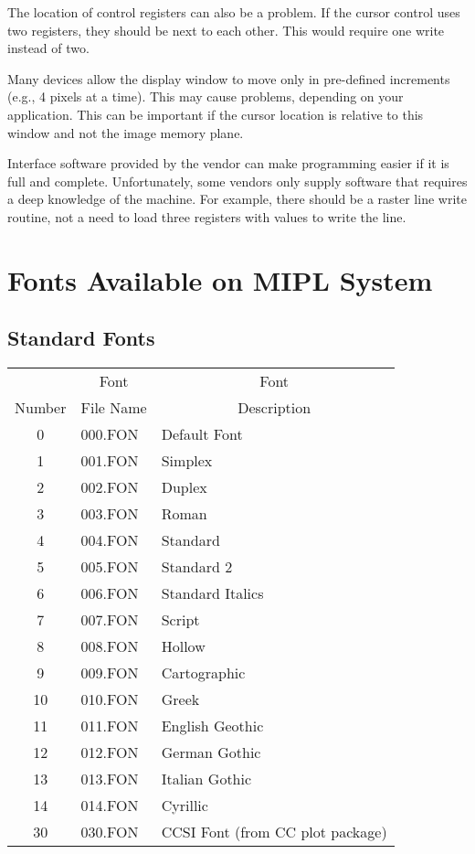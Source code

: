 The location of control registers can also be a problem.  If
the cursor control uses two registers, they should be next to each
other.  This would require one write instead of two.  

Many devices allow the display window to move only in pre-defined
increments (e.g., 4 pixels at a time).  This may cause problems,
depending on your application.  This can be important if the cursor
location is relative to this window and not the image memory plane.

Interface software provided by the vendor can make
programming easier if it is full and complete.  Unfortunately, some
vendors only supply software that requires a deep knowledge of the
machine.  For example, there should be a raster line write routine,
not a need to load three registers with values to write the line.
\cleardoublepage
\section{Fonts Available on MIPL System}
\subsection{Standard Fonts}
\begin{tabular}{|c|l|l|}
\hline
&\multicolumn{1}{|c|}{Font}
&\multicolumn{1}{|c|}{Font}\\
\multicolumn{1}{|c|}{Number}
&\multicolumn{1}{|c|}{File Name}
&\multicolumn{1}{|c|}{Description}\\
\hline
0 & 000.FON & Default Font\\
1 & 001.FON & Simplex\\
2 & 002.FON & Duplex\\
3 & 003.FON & Roman\\
4 & 004.FON & Standard\\
5 & 005.FON & Standard 2\\
6 & 006.FON & Standard Italics\\
7 & 007.FON & Script\\
8 & 008.FON & Hollow\\
9 & 009.FON & Cartographic\\
10 & 010.FON & Greek\\
11 & 011.FON & English Geothic\\
12 & 012.FON & German Gothic\\
13 & 013.FON & Italian Gothic\\
14 & 014.FON & Cyrillic\\
30 & 030.FON & CCSI Font (from CC plot package)\\ \hline
\end{tabular}
\newpage

